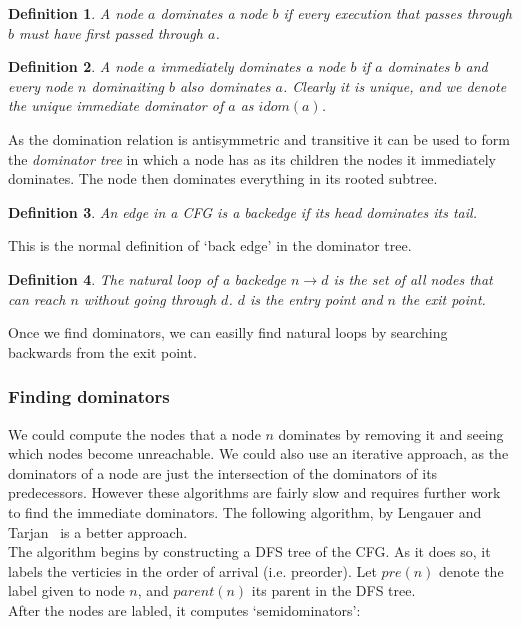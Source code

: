 \documentclass[12pt,a4paper]{article}
\newtheorem{definition}{Definition}
\begin{document}
\begin{definition}\label{def:dominator}
A node $a$ \emph{dominates} a node $b$ if every execution that passes through $b$ must have first passed through $a$.
\end{definition}

\begin{definition}\label{def:immediatedominator}
A node $a$ \emph{immediately dominates} a node $b$ if $a$ dominates $b$ and every node $n$ dominaiting $b$ also dominates $a$. Clearly it is unique, and we denote
the unique immediate dominator of $a$ as $idom(a)$.
\end{definition}

As the domination relation is antisymmetric and transitive it can be used to form the \emph{dominator tree} in which a node has as its children the nodes it
immediately dominates. The node then dominates everything in its rooted subtree.

\begin{definition}\label{def:backedge}
An edge in a CFG is a \emph{backedge} if its head dominates its tail.
\end{definition}

This is the normal definition of `back edge' in the dominator tree.

\begin{definition}\label{def:naturalloop}
The \emph{natural loop} of a backedge $n \to d$ is the set of all nodes that can reach $n$ without going through $d$. $d$ is the \emph{entry point} and $n$ the \emph{exit point.}
\end{definition}

Once we find dominators, we can easilly find natural loops by searching backwards from the exit point.

\subsubsection{Finding dominators}
We could compute the nodes that a node $n$ dominates by removing it and seeing which nodes become unreachable. We could also use an iterative approach, as the dominators of a node are  just the intersection of the dominators of its predecessors. However these algorithms are fairly slow and requires further work to find the immediate dominators.
The following algorithm, by Lengauer and Tarjan~\citep{lengtarj} is a better approach.\\
The algorithm begins by constructing a DFS tree of the CFG. As it does so, it labels the verticies in the order of arrival (i.e. preorder). Let $pre(n)$ denote the label given to node $n$, and $parent(n)$ its parent in the DFS tree.\\
After the nodes are labled, it computes `semidominators':
\end{document}
